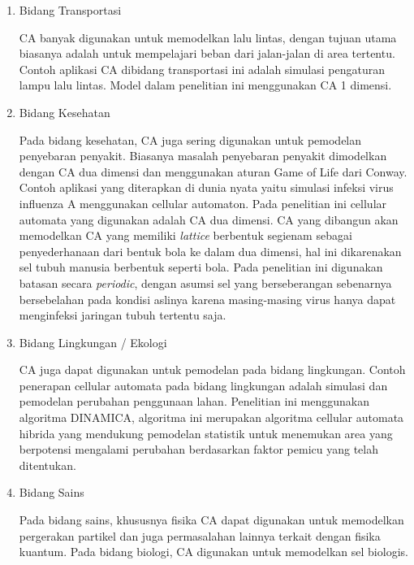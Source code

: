 		\begin{enumerate}
			\item Bidang Transportasi
			
			CA banyak digunakan untuk memodelkan lalu lintas, dengan tujuan utama biasanya adalah untuk mempelajari beban dari jalan-jalan di area tertentu. Contoh aplikasi CA dibidang transportasi ini adalah simulasi pengaturan lampu lalu lintas. Model dalam penelitian ini menggunakan CA 1 dimensi.
			
			\item Bidang Kesehatan
			
			Pada bidang kesehatan, CA juga sering digunakan untuk pemodelan penyebaran penyakit. Biasanya masalah penyebaran penyakit dimodelkan dengan CA dua dimensi dan menggunakan aturan Game of Life dari Conway. Contoh aplikasi yang diterapkan di dunia nyata yaitu simulasi infeksi virus influenza A menggunakan cellular automaton. Pada penelitian ini cellular automata yang digunakan adalah CA dua dimensi. CA yang dibangun akan memodelkan CA yang memiliki \textit{lattice} berbentuk segienam sebagai penyederhanaan dari bentuk bola ke dalam dua dimensi, hal ini dikarenakan sel tubuh manusia berbentuk seperti bola. Pada penelitian ini digunakan batasan secara \textit{periodic}, dengan asumsi sel yang berseberangan sebenarnya bersebelahan pada kondisi aslinya karena masing-masing virus hanya dapat menginfeksi jaringan tubuh tertentu saja. \cite{referensiCA1}
			
			\item Bidang Lingkungan / Ekologi
			
			CA juga dapat digunakan untuk pemodelan pada bidang lingkungan. Contoh penerapan cellular automata pada bidang lingkungan adalah simulasi dan pemodelan perubahan penggunaan lahan. Penelitian ini menggunakan algoritma DINAMICA, algoritma ini merupakan algoritma cellular automata hibrida yang mendukung pemodelan statistik untuk menemukan area yang berpotensi mengalami perubahan berdasarkan faktor pemicu yang telah ditentukan.
			
			\item Bidang Sains
			
			Pada bidang sains, khususnya fisika CA dapat digunakan untuk memodelkan pergerakan partikel dan juga permasalahan lainnya terkait dengan fisika kuantum. Pada bidang biologi, CA digunakan untuk memodelkan sel biologis.
		\end{enumerate}
		


